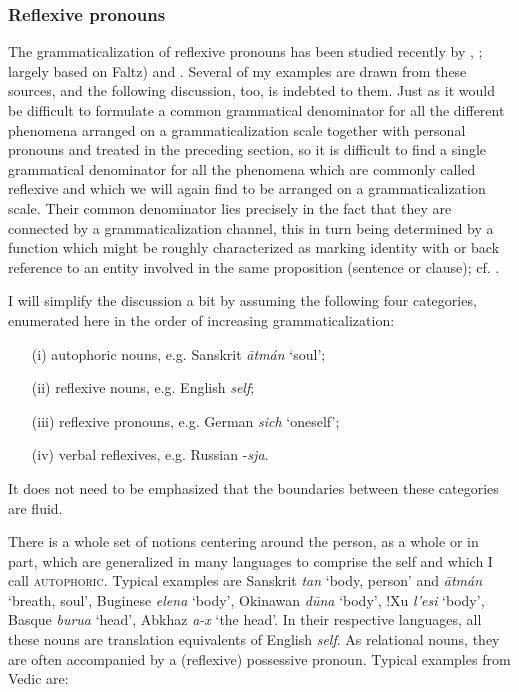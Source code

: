 \subsubsection{Reflexive pronouns} \label{sec:3.2.1.3}
The grammaticalization of reflexive pronouns has been studied recently by \citet[esp. Ch. \textsc{iv}]{Faltz1977}, \citet[640--647]{Edmondson1978}; largely based on Faltz) and \citet{Strunk1980}. Several of my examples are drawn from these sources, and the following discussion, too, is indebted to them. Just as it would be difficult to formulate a common grammatical denominator for all the different phenomena arranged on a grammaticalization scale together with personal pronouns and treated in the preceding section, so it is difficult to find a single grammatical denominator for all the phenomena which are commonly called reflexive and which we will again find to be arranged on a grammaticalization scale. Their common denominator lies precisely in the fact that they are connected by a grammaticalization channel, this in turn being determined by a function which might be roughly characterized as marking identity with or back reference to an entity involved in the same proposition (sentence or clause); cf. \citealt{Plank1979a}.

I will simplify the discussion a bit by assuming the following four categories, enumerated here in the order of increasing grammaticalization:

\begin{enumerate}
 \item[(i)]   autophoric nouns, e.g. Sanskrit \textit{\=atmán} ‘soul’;
 \item[(ii)]  reflexive nouns, e.g. English \textit{self};
 \item[(iii)]  reflexive pronouns, e.g. German \textit{sich} ‘oneself’; 
 \item[(iv)]  verbal reflexives, e.g. Russian -\textit{sja}.              
\end{enumerate}


It does not need to be emphasized that the boundaries between these categories are fluid.

There is a whole set of notions centering around the person, as a whole or in part, which are generalized in many languages to comprise the self and which I call \textsc{autophoric}. Typical examples are Sanskrit \textit{tan} ‘body, person’ and \textit{\=atmán} ‘breath, soul’, Buginese \textit{elena} ‘body’, Okinawan \textit{d\=una} ‘body’, !Xu \textit{l'esi} ‘body’, Basque \textit{burua} ‘head’, Abkhaz \textit{a-x} ‘the head’. In their respective languages, all these nouns are translation equivalents of English \textit{self}. As relational nouns, they are often accompanied by a (reflexive) possessive pronoun. Typical examples from Vedic \citep[207f]{Delbrück1888} are:

